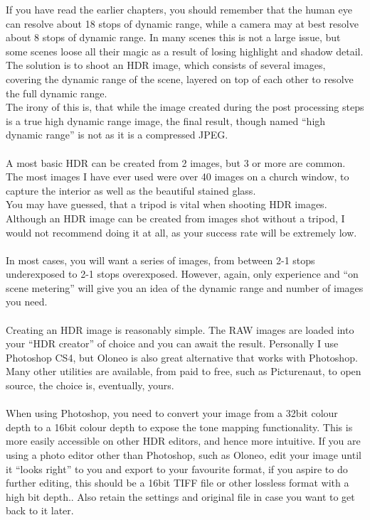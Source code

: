 If you have read the earlier chapters, you should remember that the human eye can resolve about 18 \glspl{stop} of dynamic range, while a camera may at best resolve about 8 \glspl{stop} of dynamic range. In many scenes this is not a large issue, but some scenes loose all their magic as a result of losing highlight and shadow detail. The solution is to shoot an \gls{HDR} image, which consists of several images, covering the dynamic range of the scene, layered on top of each other to resolve the full dynamic range.
\\
The irony of this is, that while the image created during the post processing steps is a true high dynamic range image, the final result, though named ``high dynamic range'' is not as it is a compressed \gls{JPEG}.
\\
\\
A most basic \gls{HDR} can be created from 2 images, but 3 or more are common. The most images I have ever used were over 40 images on a church window, to capture the interior as well as the beautiful stained glass.
\\
You may have guessed, that a tripod is vital when shooting \gls{HDR} images. Although an \gls{HDR} image can be created from images shot without a tripod, I would not recommend doing it at all, as your success rate will be extremely low.
\\
\\
In most cases, you will want a series of images, from between 2-1 \glspl{stop} underexposed to 2-1 \glspl{stop} overexposed. However, again, only experience and ``on scene metering'' will give you an idea of the dynamic range and number of images you need.
\\
\\
Creating an \gls{HDR} image is reasonably simple. The \gls{RAW} images are loaded into your ``\gls{HDR} creator'' of choice and you can await the result. Personally I use Photoshop CS4, but Oloneo is also great alternative that works with Photoshop. Many other utilities are available, from paid to free, such as Picturenaut, to open source, the choice is, eventually, yours.
\\
\\
When using Photoshop, you need to convert your image from a 32bit colour depth to a 16bit colour depth to expose the tone mapping functionality. This is more easily accessible on other \gls{HDR} editors, and hence more intuitive. If you are using a photo editor other than Photoshop, such as Oloneo, edit your image until it ``looks right'' to you and export to your favourite format, if you aspire to do further editing, this should be a 16bit TIFF file or other lossless format with a high bit depth.. Also retain the settings and original file in case you want to get back to it later.

